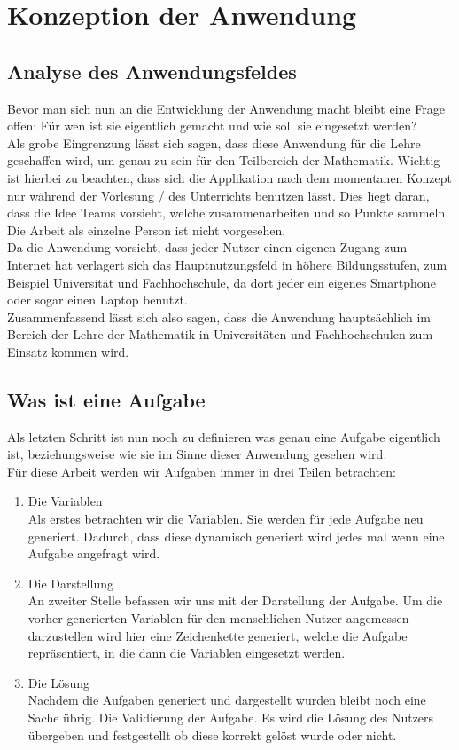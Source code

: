\chapter{Konzeption der Anwendung}

\section{Analyse des Anwendungsfeldes}

Bevor man sich nun an die Entwicklung der Anwendung macht bleibt eine Frage offen: Für wen ist sie eigentlich gemacht und wie soll sie eingesetzt werden? \\
Als grobe Eingrenzung lässt sich sagen, dass diese Anwendung für die Lehre geschaffen wird, um genau zu sein für den Teilbereich der Mathematik. Wichtig ist hierbei zu beachten, dass sich die Applikation nach dem momentanen Konzept nur während der Vorlesung / des Unterrichts benutzen lässt. Dies liegt daran, dass die Idee Teams vorsieht, welche zusammenarbeiten und so Punkte sammeln. Die Arbeit als einzelne Person ist nicht vorgesehen. \\
Da die Anwendung vorsieht, dass jeder Nutzer einen eigenen Zugang zum Internet hat verlagert sich das Hauptnutzungsfeld in höhere Bildungsstufen, zum Beispiel Universität und Fachhochschule, da dort jeder ein eigenes Smartphone oder sogar einen Laptop benutzt. \\
Zusammenfassend lässt sich also sagen, dass die Anwendung hauptsächlich im Bereich der Lehre der Mathematik in Universitäten und Fachhochschulen zum Einsatz kommen wird.

\section{Was ist eine Aufgabe}

Als letzten Schritt ist nun noch zu definieren was genau eine Aufgabe eigentlich ist, beziehungsweise wie sie im Sinne dieser Anwendung gesehen wird. \\
Für diese Arbeit werden wir Aufgaben immer in drei Teilen betrachten:
\begin{enumerate}
\item Die Variablen \\
Als erstes betrachten wir die Variablen. Sie werden für jede Aufgabe neu generiert. Dadurch, dass diese dynamisch generiert wird jedes mal wenn eine Aufgabe angefragt wird.
\item Die Darstellung \\
An zweiter Stelle befassen wir uns mit der Darstellung der Aufgabe. Um die vorher generierten Variablen für den menschlichen Nutzer angemessen darzustellen wird hier eine Zeichenkette generiert, welche die Aufgabe repräsentiert, in die dann die Variablen eingesetzt werden.
\item Die Lösung \\
Nachdem die Aufgaben generiert und dargestellt wurden bleibt noch eine Sache übrig. Die Validierung der Aufgabe. Es wird die Lösung des Nutzers übergeben und festgestellt ob diese korrekt gelöst wurde oder nicht.
\end{enumerate}

